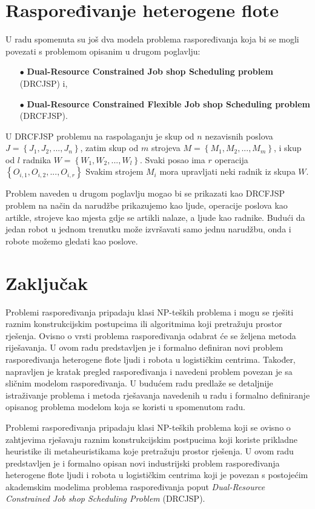 \documentclass[times, utf8, seminar]{fer}
\begin{document}
\chapter{Raspoređivanje heterogene flote}
U radu \citep{dhiflaoui2018dual} spomenuta su još dva modela problema raspoređivanja koja
bi se mogli povezati s problemom opisanim u drugom poglavlju:
\begin{itemize}
    \item[$\bullet$] \textbf{Dual-Resource Constrained Job shop Scheduling problem} (DRCJSP) i,
    \item[$\bullet$] \textbf{Dual-Resource Constrained Flexible Job shop Scheduling problem} (DRCFJSP).
\end{itemize}

U DRCFJSP problemu na raspolaganju je skup od $n$ nezavisnih poslova $J = \left\{J_1, J_2, ..., J_n\right\}$,
zatim skup od $m$ strojeva $M = \left\{M_1, M_2, ..., M_m\right\}$, i skup od $l$ radnika $W = \left\{W_1, W_2, ..., W_l\right\}$.
Svaki posao ima $r$ operacija $\left\{O_{i,1}, O_{i,2}, ..., O_{i,r}\right\}$ Svakim strojem $M_i$
mora upravljati neki radnik iz skupa $W$.

Problem naveden u drugom poglavlju mogao bi se prikazati kao DRCFJSP
problem na način da narudžbe prikazujemo kao ljude, operacije poslova
kao artikle, strojeve kao mjesta gdje se artikli nalaze, a ljude kao radnike.
Budući da jedan robot u jednom trenutku može izvršavati samo jednu
narudžbu, onda i robote možemo gledati kao poslove.

\chapter{Zaključak}
Problemi raspoređivanja pripadaju klasi NP-teških problema i mogu se rješiti
raznim konstrukcijskim postupcima ili algoritmima koji pretražuju prostor rješenja. Ovisno
o vrsti problema raspoređivanja odabrat će se željena metoda riješavanja.
U ovom radu predstavljen je i formalno definiran novi problem raspoređivanja heterogene flote
ljudi i robota u logističkim centrima.
Također, napravljen je kratak pregled raspoređivanja i navedeni problem
povezan je sa sličnim modelom raspoređivanja. U budućem radu predlaže se
detaljnije istraživanje problema i metoda rješavanja navedenih u radu \citep{dhiflaoui2018dual} i
formalno definiranje opisanog problema modelom koja se koristi u spomenutom radu.




\begin{sazetak}
Problemi raspoređivanja pripadaju klasi NP-teških problema koji se ovisno o
zahtjevima rješavaju raznim konstrukcijskim postpucima koji koriste prikladne heuristike
ili metaheuristikama koje pretražuju prostor rješenja. U ovom radu
predstavljen je i formalno opisan novi industrijski problem raspoređivanja heterogene flote ljudi i robota
u logističkim centrima koji je povezan s postojećim akademskim modelima problema raspoređivanja
poput \textit{Dual-Resource Constrained Job shop Scheduling Problem} (DRCJSP).

\end{sazetak}
\end{document}
